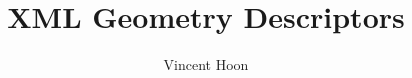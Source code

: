 \documentclass[12pt]{article}
\begin{document}
\title{XML Geometry Descriptors}
\author{Vincent Hoon}
\date{}

\maketitle
\tableofcontents

\end{document}
